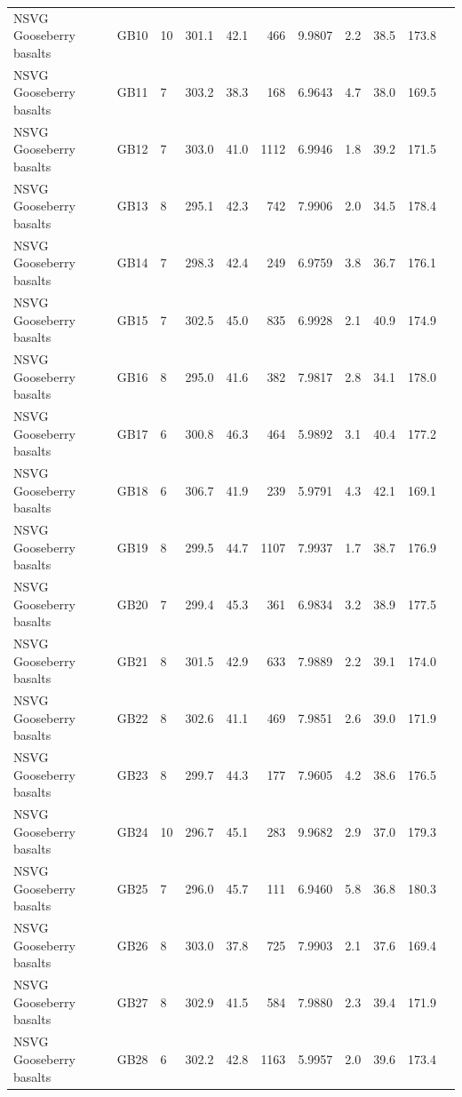 \documentclass[11pt,letterpaper]{article}
\begin{document}
\begin{table}[h!]
\begin{tabular}{|l|l|l|r|r|r|r|r|r|r|r|}
NSVG Gooseberry basalts & GB10 &  10 &  301.1 &  42.1 &  466 &  9.9807 &  2.2 &  38.5 &  173.8 \\
NSVG Gooseberry basalts & GB11 &  7 &  303.2 &  38.3 &  168 &  6.9643 &  4.7 &  38.0 &  169.5 \\
NSVG Gooseberry basalts & GB12 &  7 &  303.0 &  41.0 &  1112 &  6.9946 &  1.8 &  39.2 &  171.5 \\
NSVG Gooseberry basalts & GB13 &  8 &  295.1 &  42.3 &  742 &  7.9906 &  2.0 &  34.5 &  178.4 \\
NSVG Gooseberry basalts & GB14 &  7 &  298.3 &  42.4 &  249 &  6.9759 &  3.8 &  36.7 &  176.1 \\
NSVG Gooseberry basalts & GB15 &  7 &  302.5 &  45.0 &  835 &  6.9928 &  2.1 &  40.9 &  174.9 \\
NSVG Gooseberry basalts & GB16 &  8 &  295.0 &  41.6 &  382 &  7.9817 &  2.8 &  34.1 &  178.0 \\
NSVG Gooseberry basalts & GB17 &  6 &  300.8 &  46.3 &  464 &  5.9892 &  3.1 &  40.4 &  177.2 \\
NSVG Gooseberry basalts & GB18 &  6 &  306.7 &  41.9 &  239 &  5.9791 &  4.3 &  42.1 &  169.1 \\
NSVG Gooseberry basalts & GB19 &  8 &  299.5 &  44.7 &  1107 &  7.9937 &  1.7 &  38.7 &  176.9 \\
NSVG Gooseberry basalts & GB20 &  7 &  299.4 &  45.3 &  361 &  6.9834 &  3.2 &  38.9 &  177.5 \\
NSVG Gooseberry basalts & GB21 &  8 &  301.5 &  42.9 &  633 &  7.9889 &  2.2 &  39.1 &  174.0 \\
NSVG Gooseberry basalts & GB22 &  8 &  302.6 &  41.1 &  469 &  7.9851 &  2.6 &  39.0 &  171.9 \\
NSVG Gooseberry basalts & GB23 &  8 &  299.7 &  44.3 &  177 &  7.9605 &  4.2 &  38.6 &  176.5 \\
NSVG Gooseberry basalts & GB24 &  10 &  296.7 &  45.1 &  283 &  9.9682 &  2.9 &  37.0 &  179.3 \\
NSVG Gooseberry basalts & GB25 &  7 &  296.0 &  45.7 &  111 &  6.9460 &  5.8 &  36.8 &  180.3 \\
NSVG Gooseberry basalts & GB26 &  8 &  303.0 &  37.8 &  725 &  7.9903 &  2.1 &  37.6 &  169.4 \\
NSVG Gooseberry basalts & GB27 &  8 &  302.9 &  41.5 &  584 &  7.9880 &  2.3 &  39.4 &  171.9 \\
NSVG Gooseberry basalts & GB28 &  6 &  302.2 &  42.8 &  1163 &  5.9957 &  2.0 &  39.6 &  173.4 \\

\end{tabular}
\end{table}
\end{document}
